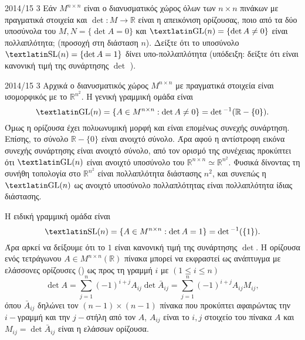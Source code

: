 \documentclass[a4paper,11pt]{article}
\begin{document}
\begin{exercise}{2014/15 3}
    Εάν \( M^{n \times n} \) είναι ο διανυσματικός χώρος όλων των \( n \times
    n\) πινάκων με πραγματικά στοιχεία και \( \det : M \to \mathbb{R}
    \) είναι η απεικόνιση ορίζουσας, ποιο από τα δύο υποσύνολα του
    \( M, N = \{ \det A = 0\} \) και \( \text{\tl{GL}}(n) = \{
    \det A \neq 0 \} \) είναι πολλαπλότητα; (προσοχή στη διάσταση
    \( n \)).
    Δείξτε ότι το υποσύνολο \( \text{\tl{SL}}(n) = \{ \det A = 1 \} \)
    δίνει υπο-πολλαπλότητα (υπόδειξη: δείξτε ότι είναι κανονική τιμή της
    συνάρτησης \( \det \) ).
\end{exercise}
\begin{solution}{2014/15 3}
    Αρχικά ο διανυσματικός χώρος \( M^{n\times n} \) με πραγματικά στοιχεία είναι
    ισομορφικός με το \( \mathbb{R}^{n^2} \). Η γενική γραμμική ομάδα είναι
    \begin{equation*}
        \text{\tl{GL}}(n) = \{A \in M^{n \times n}: \det A \neq 0 \} =
        \det{}^{-1}(\mathbb{R} - \{0\}).
    \end{equation*}
    Όμως η ορίζουσα έχει πολυωνυμική μορφή και είναι επομένως συνεχής συνάρτηση.
    Επίσης, το σύνολο \( \mathbb{R} - \{0\} \) είναι ανοιχτό σύνολο. Άρα αφού η
    αντίστροφη εικόνα συνεχής συνάρτησης είναι ανοιχτό σύνολο, από τον ορισμό της συνέχειας
    προκύπτει ότι \( \text{\tl{GL}}(n) \) είναι ανοιχτό υποσύνολο του \(
    \mathbb{R}^{n \times n} \simeq \mathbb{R}^{n^2}\). Φυσικά δίνοντας τη
    συνήθη τοπολογία στο \( \mathbb{R}^{n^2} \) είναι πολλαπλότητα διάστασης
    \( n^2 \), και συνεπώς η \( \text{\tl{GL}}(n) \) ως ανοιχτό υποσύνολο
    πολλαπλότητας είναι πολλαπλότητα ίδιας διάστασης.

    Η ειδική γραμμική ομάδα είναι
    \begin{equation*}
        \text{\tl{SL}}(n) = \{A \in M^{n \times n}: \det A = 1 \} =
        \det{}^{-1}(\{1\}).
    \end{equation*}
    Άρα αρκεί να δείξουμε ότι το \( 1 \) είναι κανονική τιμή της συνάρτησης
    \( \det \). Η ορίζουσα ενός τετράγωνου \( A \in M^{n \times n}(\mathbb{R}) \)
    πίνακα μπορεί να εκφραστεί ως ανάπτυγμα με ελάσσονες ορίζουσες
    () ως προς τη γραμμή \( i \) με \((1 \leq i \leq n) \)
    \begin{equation}\label{eq:1415_ex_3_det}
        \det A = \sum_{j = 1}^n
        (-1)^{i+j}A_{ij}\det\bar{A}_{ij}=
        \sum_{j = 1}^n (-1)^{i+j}A_{ij}M_{ij},
    \end{equation}
    όπου \( \bar{A}_{ij} \) δηλώνει τον \( (n - 1)\times(n - 1) \) πίνακα που
    προκύπτει αφαιρώντας την \( i-\)γραμμή και την \(j-\)στήλη
    από τον \(A\), \(A_{ij}\) είναι το \(i,j\) στοιχείο του πίνακα \(A\) και \(
    M_{ij} = \det \bar{A}_{ij}\) είναι η ελάσσων ορίζουσα.


\end{solution}
\end{document}
